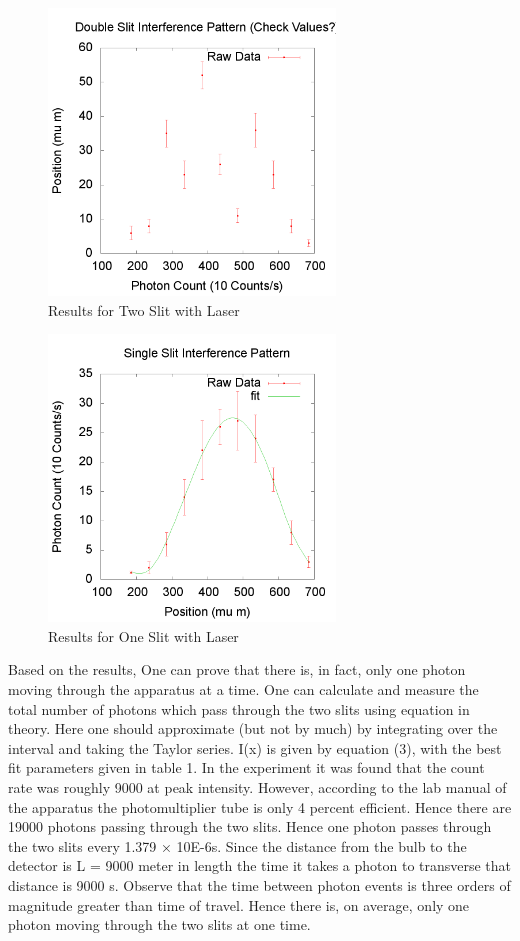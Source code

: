\documentclass[12pt,twocolumn]{article}
\begin{document}
\begin{figure}[h!]
	\centering
	\label{fig:2slit}
	\includegraphics[width=3in]{images/Twoslit}
	\caption{Results for Two Slit with Laser}
\end{figure}
\begin{figure}[h!]
	\centering
	\label{fig:1slit}
	\includegraphics[width=3in]{images/Oneslit}
	\caption{Results for One Slit with Laser}
\end{figure}
Based on the results, One can prove that there is, in fact, only one photon moving through the apparatus
at a time. One can calculate and measure the total number of photons which pass through the two slits using equation in theory.  Here one should approximate (but not by much) by integrating over the interval and taking the Taylor series. I(x) is given by equation (3), with the best fit parameters given in table 1. In the experiment it was found that the count rate was roughly 9000 at peak intensity. However, according to the lab manual of the apparatus the photomultiplier tube is only 4 percent efficient. Hence there are 19000 photons passing through the two slits. Hence one photon passes through the two slits every 1.379 × 10E-6s. Since the distance from the bulb to the detector is L = 9000 meter in length the time it takes a photon to transverse that distance is 9000 s. Observe that the time between photon events is three orders of magnitude greater than time of travel. Hence there is, on average, only one photon moving through the two slits at one time.
\end{document}
